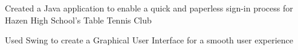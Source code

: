 \documentclass[]{deedy-resume}
\begin{document}
\begin{minipage}[t]{0.66\textwidth}
\begin{tightemize}
\item Created a Java application to enable a quick and paperless sign-in process for Hazen High School's Table Tennis Club
\item Used Swing to create a Graphical User Interface for a smooth user experience
\end{tightemize}
\sectionsep


%
%
%

\end{minipage} 
\end{document}
